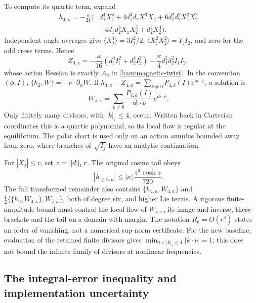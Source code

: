 To compute its quartic term, expand
\begin{equation}\label{ss:quartic-polynomial}
\begin{aligned}
 h_{4,\kappa}=-\frac{\kappa}{24}\bigl(&d_1^4X_1^4
    +4d_1^3d_2X_1^3X_2+6d_1^2d_2^2X_1^2X_2^2\\
    &+4d_1d_2^3X_1X_2^3+d_2^4X_2^4\bigr).
\end{aligned}
\end{equation}
Independent angle averages give
$\langle X_j^4\rangle=3I_j^2/2$,
$\langle X_1^2X_2^2\rangle=I_1I_2$, and zero for the odd cross terms. Hence
\[
 Z_{4,\kappa}=-\frac{\kappa}{16}
       (d_1^4I_1^2+d_2^4I_2^2)
       -\frac{\kappa}{4}d_1^2d_2^2I_1I_2,
\]
whose action Hessian is exactly $A_\kappa$ in \eqref{kam:magnetic-twist}. In the convention $(\phi,I)$,
$\{h_2,W\}=-\nu\cdot\partial_\phi W$.
If $h_{4,\kappa}-Z_{4,\kappa}=\sum_{k\ne0}P_{4,k}(I)e^{\mathrm i k\cdot\phi}$, a solution is
\begin{equation}\label{ss:quartic-generator}
 W_{4,\kappa}=
 \sum_{k\ne0}\frac{P_{4,k}(I)}{\mathrm i k\cdot\nu}
                 e^{\mathrm i k\cdot\phi}.
\end{equation}
Only finitely many divisors, with $|k|_1\le4$, occur. Written back in Cartesian coordinates this is a quartic polynomial, so its local flow is regular at the equilibrium. The polar chart is used only on an action annulus bounded away from zero, where branches of $\sqrt{I_j}$ have an analytic continuation.

For $|X_j|\le r$, set $z=\left\lVert d\right\rVert_1r$. The original cosine tail obeys
\begin{equation}\label{ss:cosine-tail}
 |h_{\ge6,\kappa}|\le|\kappa|\,\frac{z^6\cosh z}{720}.
\end{equation}
The full transformed remainder also contains
$\{h_{4,\kappa},W_{4,\kappa}\}$ and
$\tfrac12\{\{h_2,W_{4,\kappa}\},W_{4,\kappa}\}$,
both of degree six, and higher Lie terms. A rigorous finite-amplitude bound must control the local flow of $W_{4,\kappa}$, its image and inverse, these brackets and the tail on a domain with margin. The notation $R_6=O(r^6)$ states an order of vanishing, not a numerical sup-norm certificate. For the new baseline, evaluation of the retained finite divisors gives $\min_{0<|k|_1\le4}|k\cdot\nu|=1$; this does not bound the infinite family of divisors at nonlinear frequencies.

\subsection{The integral-error inequality and implementation uncertainty}
\label{ss:integral-error}

